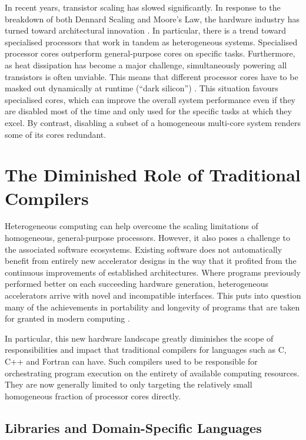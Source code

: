    In recent years, transistor scaling has slowed significantly.
    In response to the breakdown of both Dennard Scaling and Moore's Law, the
    hardware industry has turned toward architectural innovation
    \citep{7878935}.
    In particular, there is a trend toward specialised processors that work
    in tandem as heterogeneous systems.
    Specialised processor cores outperform general-purpose cores on
    specific tasks.
    Furthermore, as heat dissipation has become a major challenge,
    simultaneously powering all transistors is often unviable.
    This means that different processor cores have to be masked out
    dynamically at runtime (``dark silicon'') \citep{6307773}.
    This situation favours specialised cores, which can improve the overall
    system performance even if they are disabled most of the time and only used
    for the specific tasks at which they excel.
    By contrast, disabling a subset of a homogeneous multi-core system renders
    some of its cores redundant.

\section{The Diminished Role of Traditional Compilers}

    Heterogeneous computing can help overcome the scaling limitations of
    homogeneous, general-purpose processors.
    However, it also poses a challenge to the associated software ecosystems.
    Existing software does not automatically benefit from entirely new
    accelerator designs in the way that it profited from the continuous
    improvements of established architectures.
    Where programs previously performed better on each succeeding hardware
    generation, heterogeneous accelerators arrive with novel and incompatible
    interfaces.
    This puts into question many of the achievements in portability and
    longevity of programs that are taken for granted in modern computing
    \citep{8719512}.

    In particular, this new hardware landscape greatly diminishes the scope of
    responsibilities and impact that traditional compilers for languages such as
    C, C++ and Fortran can have.
    Such compilers used to be responsible for orchestrating
    program execution on the entirety of available computing resources.
    They are now generally limited to only targeting the relatively small
    homogeneous fraction of processor cores directly.

\subsection{Libraries and Domain-Specific Languages}

